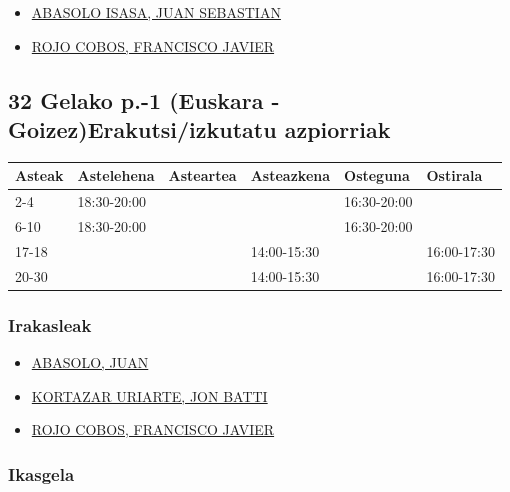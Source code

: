 \documentclass[
]{book}
\providecommand{\tightlist}{%
  \setlength{\itemsep}{0pt}\setlength{\parskip}{0pt}}
\begin{document}
\begin{itemize}
\tightlist
\item
  \href{https://www.ehu.eus/eu/web/hld-dll/ikasgaiak?p_redirect=consultaTutorias\&p_anyo_acad=20200\&p_idp=351472}{ABASOLO ISASA, JUAN SEBASTIAN}
\item
  \href{https://www.ehu.eus/eu/web/hld-dll/ikasgaiak?p_redirect=consultaTutorias\&p_anyo_acad=20200\&p_idp=4636}{ROJO COBOS, FRANCISCO JAVIER}
\end{itemize}

\hypertarget{gelako-p.-1-euskara---goizezerakutsiizkutatu-azpiorriak}{%
\subsection{32 Gelako p.-1 (Euskara - Goizez)Erakutsi/izkutatu azpiorriak}\label{gelako-p.-1-euskara---goizezerakutsiizkutatu-azpiorriak}}

\begin{longtable}[]{@{}llllll@{}}
\toprule
Asteak & Astelehena & Asteartea & Asteazkena & Osteguna & Ostirala\tabularnewline
\midrule
\endhead
2-4 & 18:30-20:00 & & & 16:30-20:00 &\tabularnewline
6-10 & 18:30-20:00 & & & 16:30-20:00 &\tabularnewline
17-18 & & & 14:00-15:30 & & 16:00-17:30\tabularnewline
20-30 & & & 14:00-15:30 & & 16:00-17:30\tabularnewline
\bottomrule
\end{longtable}

\hypertarget{irakasleak-1}{%
\subsubsection*{Irakasleak}\label{irakasleak-1}}

\begin{itemize}
\tightlist
\item
  \href{https://www.ehu.eus/eu/web/hld-dll/ikasgaiak?p_redirect=consultaTutorias\&p_anyo_acad=20200\&p_idp=351472}{ABASOLO, JUAN}
\item
  \href{https://www.ehu.eus/eu/web/hld-dll/ikasgaiak?p_redirect=consultaTutorias\&p_anyo_acad=20200\&p_idp=2768}{KORTAZAR URIARTE, JON BATTI}
\item
  \href{https://www.ehu.eus/eu/web/hld-dll/ikasgaiak?p_redirect=consultaTutorias\&p_anyo_acad=20200\&p_idp=4636}{ROJO COBOS, FRANCISCO JAVIER}
\end{itemize}

\hypertarget{ikasgela}{%
\subsubsection*{Ikasgela}\label{ikasgela}}
\end{document}
